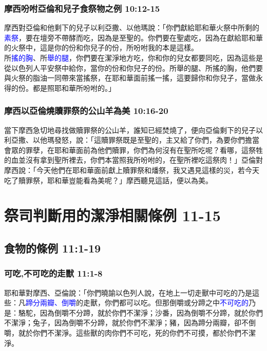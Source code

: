 \subsubsection{摩西吩咐亞倫和兒子食祭物之例 10:12-15}
摩西對亞倫和他剩下的兒子以利亞撒、以他瑪說：「你們獻給耶和華火祭中所剩的\textcolor{blue}{素祭}，要在壇旁不帶酵而吃，因為是至聖的。你們要在聖處吃，因為在獻給耶和華的火祭中，這是你的份和你兒子的份，所吩咐我的本是這樣。\\
所\textcolor{blue}{搖的胸}、所\textcolor{blue}{舉的腿}，你們要在潔淨地方吃，你和你的兒女都要同吃，因為這些是從以色列人平安祭中給你，當你的份和你兒子的份。所舉的腿、所搖的胸，他們要與火祭的脂油一同帶來當搖祭，在耶和華面前搖一搖，這要歸你和你兒子，當做永得的份。都是照耶和華所吩咐的。」

\subsubsection{摩西以亞倫燒贖罪祭的公山羊為美 10:16-20}
當下摩西急切地尋找做贖罪祭的公山羊，誰知已經焚燒了，便向亞倫剩下的兒子以利亞撒、以他瑪發怒，說：「這贖罪祭既是至聖的，主又給了你們，為要你們擔當會眾的罪孽，在耶和華面前為他們贖罪，你們為何沒有在聖所吃呢？看哪，這祭牲的血並沒有拿到聖所裡去，你們本當照我所吩咐的，在聖所裡吃這祭肉！」亞倫對摩西說：「今天他們在耶和華面前獻上贖罪祭和燔祭，我又遇見這樣的災，若今天吃了贖罪祭，耶和華豈能看為美呢？」摩西聽見這話，便以為美。

\section{祭司判斷用的潔淨相關條例 11-15}
\subsection{食物的條例 11:1-19}
\subsubsection{可吃,不可吃的走獸 11:1-8}
耶和華對摩西、亞倫說：「你們曉諭以色列人說，在地上一切走獸中可吃的乃是這些：凡\textcolor{blue}{蹄分兩瓣、倒嚼}的走獸，你們都可以吃。但那倒嚼或分蹄之中\textcolor{blue}{不可吃的}乃是：駱駝，因為倒嚼不分蹄，就於你們不潔淨；沙番，因為倒嚼不分蹄，就於你們不潔淨；兔子，因為倒嚼不分蹄，就於你們不潔淨；豬，因為蹄分兩瓣，卻不倒嚼，就於你們不潔淨。這些獸的肉你們不可吃，死的你們不可摸，都於你們不潔淨。

